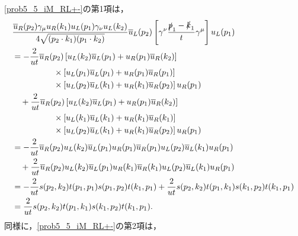 \eqref{prob5_5_iM_RL+-}の第1項は，
\begin{align}
  \begin{split}
    & \frac{\overline{u}_R(p_2)\gamma_\mu u_R(k_1) u_L(p_1)\gamma_\nu u_L(k_2)}{4\sqrt{(p_2 \cdot k_1)(p_1 \cdot k_2)}} \overline{u}_L(p_2)
    \left[ \gamma^\nu \frac{\slashed{p}_1 - \slashed{k}_1}{t} \gamma^\mu \right] u_L(p_1) \\
    &= -\frac{2}{ut} \overline{u}_R(p_2) \left[ u_L(k_2)\overline{u}_L(p_1) + u_R(p_1)\overline{u}_R(k_2) \right] \\
    &\qquad\qquad\quad\times \left[ u_L(p_1)\overline{u}_L(p_1) + u_R(p_1)\overline{u}_R(p_1) \right] \\
    &\qquad\qquad\quad\times \left[ u_L(p_2)\overline{u}_L(k_1) + u_R(k_1)\overline{u}_R(p_2) \right] u_R(p_1) \\
    &\quad +\frac{2}{ut} \overline{u}_R(p_2) \left[ u_L(k_2)\overline{u}_L(p_1) + u_R(p_1)\overline{u}_R(k_2) \right] \\
    &\qquad\qquad\quad\times \left[ u_L(k_1)\overline{u}_L(k_1) + u_R(k_1)\overline{u}_R(k_1) \right] \\
    &\qquad\qquad\quad\times \left[ u_L(p_2)\overline{u}_L(k_1) + u_R(k_1)\overline{u}_R(p_2) \right] u_R(p_1) \\
    &= -\frac{2}{ut} \overline{u}_R(p_2) u_L(k_2)\overline{u}_L(p_1) u_R(p_1)\overline{u}_R(p_1) u_L(p_2)\overline{u}_L(k_1) u_R(p_1) \\
    &\quad +\frac{2}{ut} \overline{u}_R(p_2) u_L(k_2)\overline{u}_L(p_1) u_R(k_1)\overline{u}_R(k_1) u_L(p_2)\overline{u}_L(k_1) u_R(p_1) \\
    &= -\frac{2}{ut} s(p_2, k_2) t(p_1, p_1) s(p_1, p_2) t(k_1, p_1) + \frac{2}{ut} s(p_2, k_2) t(p_1, k_1) s(k_1, p_2) t(k_1, p_1) \\
    &= \frac{2}{ut} s(p_2, k_2) t(p_1, k_1) s(k_1, p_2) t(k_1, p_1) .
  \end{split}
  \label{prob5_5_iM_RL+-_term1}
\end{align}
同様に，\eqref{prob5_5_iM_RL+-}の第2項は，
